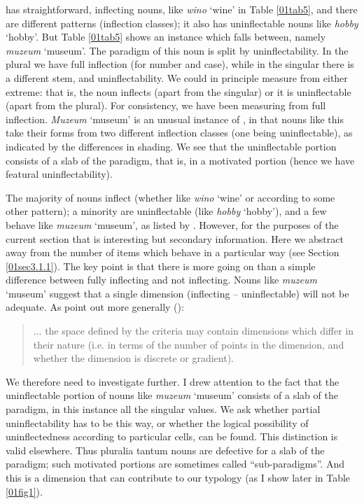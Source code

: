 \documentclass[output=paper,colorlinks,citecolor=brown]{langscibook}
\begin{document}
 has straightforward, inflecting nouns, like \textit{wino} `wine' in Table \ref{01tab5}, and there are different patterns (inflection classes); it also has uninflectable nouns like \textit{hobby} `hobby'. But Table \ref{01tab5} shows an instance which falls between, namely \textit{muzeum} `museum'. The paradigm of this noun is split by uninflectability. In the plural we have full inflection (for number and case), while in the singular there is a different stem, and uninflectability. We could in principle measure from either extreme: that is, the noun inflects (apart from the singular) or it is uninflectable (apart from the plural). For consistency, we have been measuring from full inflection. \textit{Muzeum} `museum' is an unusual instance of , in that nouns like this take their forms from two different inflection classes (one being uninflectable), as indicated by the differences in shading. We see that the uninflectable portion consists of a slab of the paradigm, that is, in a motivated portion (hence we have featural uninflectability).

The majority of  nouns inflect (whether like \textit{wino} `wine' or according to some other pattern); a minority are uninflectable (like \textit{hobby} `hobby'), and a few behave like \textit{muzeum} `museum', as listed by \citet[118]{swan2002}. However, for the purposes of the current section that is interesting but secondary information. Here we abstract away from the number of items which behave in a particular way (see Section \ref{01sec3.1.1}). The key point is that there is more going on than a simple difference between fully inflecting and not inflecting. Nouns like \textit{muzeum} `museum' suggest that a single dimension (inflecting -- uninflectable) will not be adequate. As \citeauthor{brownchumakina2013} point out more generally (\citeyear[6]{brownchumakina2013}):

\begin{quote}
	... the space defined by the criteria may contain dimensions which differ in their nature (i.e. in terms of the number of points in the	dimension, and whether the dimension is discrete or gradient).
\end{quote}

We therefore need to investigate further. I drew attention to the fact that the uninflectable portion of nouns like \textit{muzeum} `museum' consists of a slab of the paradigm, in this instance all the singular values. We ask whether partial uninflectability has to be this way, or whether the logical possibility of uninflectedness according to particular cells, can be found. This distinction is valid elsewhere. Thus pluralia tantum nouns are defective for a slab of the paradigm; such motivated portions are sometimes called ``sub-paradigms''. And this is a dimension that can contribute to our typology (as I show later in Table \ref{01fig1}).
\end{document}
